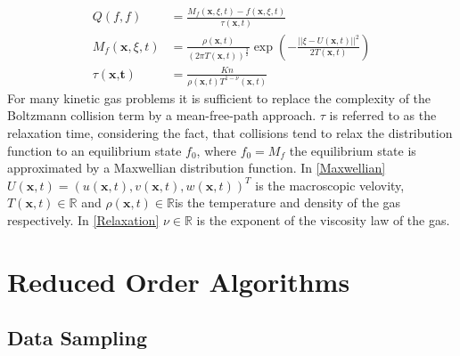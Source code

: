 \documentclass[12pt, a4paper]{article}
\begin{document}
\begin{align}
Q(f,f) &= \frac{M_f(\textbf{x},\xi,t) - f(\textbf{x},\xi,t)}{\tau(\textbf{x},t)} \label{Collision}\\
M_f(\textbf{x},\xi,t) &= \frac{\rho(\textbf{x},t)}{(2\pi T(\textbf{x},t))^{\frac{3}{2}}}\exp(-\frac{||\xi -U(\textbf{x},t)||^2}{2T(\textbf{x},t)})  \label{Maxwellian}\\
\tau(\textbf{x,t}) &= \frac{Kn}{\rho(\textbf{x},t)T^{1-\nu}(\textbf{x},t)} \label{Relaxation}
\end{align}
For many kinetic gas problems it is sufficient to replace the complexity of the Boltzmann collision term by a mean-free-path approach. $\tau$ is referred to as the relaxation time, considering the fact, that collisions tend to relax the distribution function to an equilibrium state $f_0$, where $f_0 = M_f$ the equilibrium state is approximated by a Maxwellian distribution function. In \cref{Maxwellian} $U(\textbf{x},t) = (u(\textbf{x},t),v(\textbf{x},t),w(\textbf{x},t))^T$ is the macroscopic velovity, $T(\textbf{x},t) \in \mathbb{R}$ and $\rho(\textbf{x},t)\in \mathbb{R}$is the temperature and density of the gas respectively. In \cref{Relaxation} $\nu\in\mathbb{R}$ is the exponent of the viscosity law of the gas.
\section{Reduced Order Algorithms}
\subsection{Data Sampling}
\end{document}
